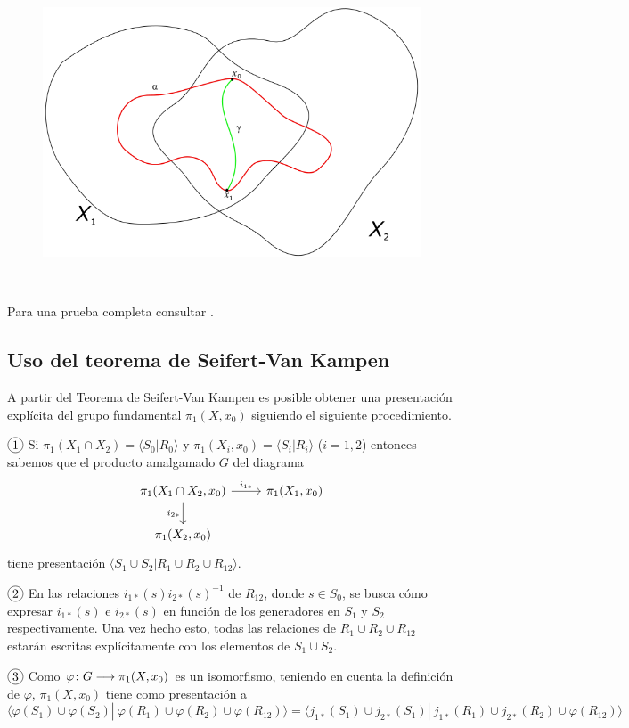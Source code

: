 \documentclass[GTS.tex]{subfiles}
\begin{document}
\begin{figure}[h!]
	\includegraphics[scale=0.4]{text4180}
\end{figure}\

Para una prueba completa consultar \cite{Hatcher}.

\newpage

\subsection{Uso del teorema de Seifert-Van Kampen}

A partir del Teorema de Seifert-Van Kampen es posible obtener una presentación explícita del grupo fundamental $\pi_1(X,x_0)$ siguiendo el siguiente procedimiento.

$\circled{1}$ Si $\pi_1(X_1\cap X_2)=\langle S_0|R_0\rangle$ y $\pi_1(X_i,x_0)=\langle S_i|R_i\rangle$ ($i=1,2$) entonces sabemos que el producto amalgamado $G$ del diagrama
\[
\begin{tikzcd}
\pi_1(X_1\cap X_2,x_0) \ar[r, "i_{1*}"]\arrow[d,"i_{2*} "'] & \pi_1(X_1,x_0)\\
\pi_1(X_2,x_0)
\end{tikzcd}
\]
tiene presentación $\langle S_1\cup S_2 | R_1\cup R_2\cup R_{12}\rangle$.

$\circled{2}$ En las relaciones $i_{1*}(s)i_{2*}(s)^{-1}$ de $R_{12}$, donde $s\in S_0$, se busca cómo expresar $i_{1*}(s)$ e $i_{2*}(s)$ en función de los generadores en $S_1$ y $S_2$ respectivamente. Una vez hecho esto, todas las relaciones de $R_1\cup R_2\cup R_{12}$ estarán escritas explícitamente con los elementos de $S_1\cup S_2$.

$\circled{3}$ Como $\varphi\colon{G}\longrightarrow{\pi_1(X,x_0)}$ es un isomorfismo, teniendo en cuenta la definición de $\varphi$, $\pi_1(X,x_0)$ tiene como presentación a
\[
\langle\varphi(S_1)\cup\varphi(S_2)|\ \varphi(R_1)\cup\varphi(R_2)\cup\varphi(R_{12})\rangle=\langle j_{1*}(S_1)\cup j_{2*}(S_1)|\ j_{1*}(R_1)\cup j_{2*}(R_2)\cup\varphi(R_{12})\rangle
\]
\end{document}
